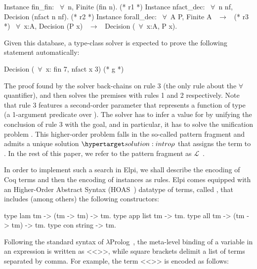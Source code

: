 \documentclass[sigconf,natbib=false,review]{acmart}
\newcommand{\llambda}{\ensuremath{\mathcal{L}}\xspace}
\begin{document}
\begin{coqcode}
Instance fin_fin: ~$\forall$~n, Finite (fin n).             (* r1 *)
Instance nfact_dec: ~$\forall$~n nf, Decision (nfact n nf). (* r2 *)
Instance forall_dec: ~$\forall$~A P, Finite A ~$\to$~            (* r3 *)
  ~$\forall$~x:A, Decision (P x) ~$\to$~ Decision (~$\forall$~x:A, P x).
\end{coqcode}

\noindent Given this database, a type-class solver is expected to
prove the following statement automatically:

\begin{coqcode}
  Decision (~$\forall$~x: fin 7, nfact x 3)                   (* g *)
\end{coqcode}

\noindent
The proof found by the solver back-chains on rule 3 (the only rule
about the $\forall$ quantifier), and then solves the premises with
rules 1 and 2 respectively.
Note that rule 3 features a second-order parameter  that represents
a function of type  (a 1-argument predicate over ).
The solver has to infer a value for  by unifying the conclusion
of rule 3 with the goal, and in particular, it has to solve the unification
problem . This higher-order problem falls in the so-called 
pattern fragment and admits a unique
solution $\customlabel{solution:intro}{\rho}$ that assigns
the term  to .
In the rest of this paper, we refer to the pattern fragment as
\llambda~\cite{miller92jsc}.

In order to implement such a search in Elpi, we shall describe the encoding
of Coq terms and then the encoding of instances as rules.
Elpi comes equipped with
an Higher-Order Abstract Syntax (HOAS~\cite{10.1145/53990.54010}) datatype of
terms, called , that includes (among others) the following
constructors:

\begin{elpicode}
type lam  tm -> (tm -> tm) -> tm.     %
type app  list tm -> tm.              %
type all  tm -> (tm -> tm) -> tm.     %
type con  string -> tm.               %
\end{elpicode}

\noindent
Following the standard syntax of $\lambda$Prolog~\cite{miller_nadathur_2012},
the meta-level binding of a variable  in an expression
 is written as <<>>, while square brackets delimit a
list of terms separated by comma. For example, the term
<<>> is encoded as follows:
\end{document}
